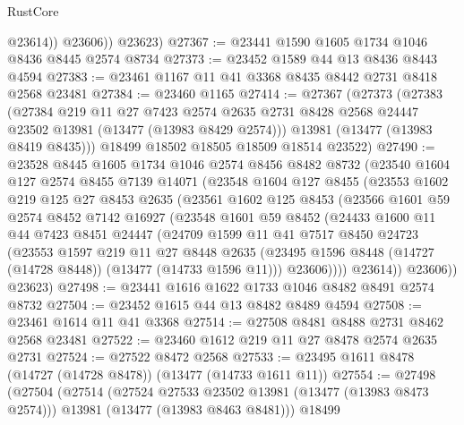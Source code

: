 \begin{lexlean}{RustCore}
\begin{coremodule}
              @23614))
          @23606))
      @23623)
@27367 := @23441 @1590 @1605 @1734 @1046 @8436 @8445 @2574 @8734
@27373 := @23452 @1589 @44 @13 @8436 @8443 @4594
@27383 := @23461 @1167 @11 @41 @3368 @8435 @8442 @2731 @8418 @2568 @23481
@27384 := @23460 @1165
@27414 := @27367
    (@27373
      (@27383
        (@27384
          @219
          @11
          @27
          @7423
          @2574
          @2635
          @2731
          @8428
          @2568
          @24447
          @23502
          @13981
          (@13477 (@13983 @8429 @2574)))
        @13981
        (@13477 (@13983 @8419 @8435)))
      @18499
      @18502
      @18505
      @18509
      @18514
      @23522)
@27490 := @23528
    @8445
    @1605
    @1734
    @1046
    @2574
    @8456
    @8482
    @8732
    (@23540
      @1604
      @127
      @2574
      @8455
      @7139
      @14071
      (@23548
        @1604
        @127
        @8455
        (@23553
          @1602
          @219
          @125
          @27
          @8453
          @2635
          (@23561
            @1602
            @125
            @8453
            (@23566
              @1601
              @59
              @2574
              @8452
              @7142
              @16927
              (@23548
                @1601
                @59
                @8452
                (@24433
                  @1600
                  @11
                  @44
                  @7423
                  @8451
                  @24447
                  (@24709
                    @1599
                    @11
                    @41
                    @7517
                    @8450
                    @24723
                    (@23553
                      @1597
                      @219
                      @11
                      @27
                      @8448
                      @2635
                      (@23495 @1596 @8448 (@14727 (@14728 @8448)) (@13477 (@14733 @1596 @11)))
                      @23606))))
              @23614))
          @23606))
      @23623)
@27498 := @23441 @1616 @1622 @1733 @1046 @8482 @8491 @2574 @8732
@27504 := @23452 @1615 @44 @13 @8482 @8489 @4594
@27508 := @23461 @1614 @11 @41 @3368
@27514 := @27508 @8481 @8488 @2731 @8462 @2568 @23481
@27522 := @23460 @1612 @219 @11 @27 @8478 @2574 @2635 @2731
@27524 := @27522 @8472 @2568
@27533 := @23495 @1611 @8478 (@14727 (@14728 @8478)) (@13477 (@14733 @1611 @11))
@27554 := @27498
    (@27504
      (@27514
        (@27524 @27533 @23502 @13981 (@13477 (@13983 @8473 @2574)))
        @13981
        (@13477 (@13983 @8463 @8481)))
      @18499

\end{coremodule}
\end{lexlean}
